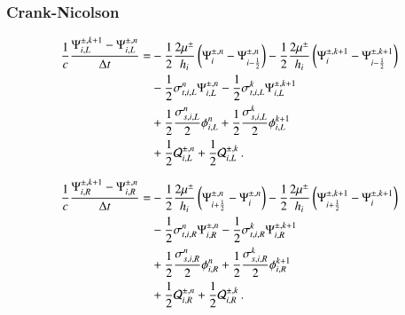 \subsubsection{Crank-Nicolson}
\begin{equation}\lequ{S2CNfullL}\begin{split}
  \frac{1}{c}\frac{\Psi\iL^{\pm,k+1}-\Psi\iL^{\pm,n}}{\dt} = &
  -\half\frac{2\mu^\pm}{h_i}\fn{\Psi^{\pm,n}_i - \Psi^{\pm,n}_{i-\half}}
  -\half\frac{2\mu^\pm}{h_i}\fn{\Psi^{\pm,k+1}_i - \Psi^{\pm,k+1}_{i-\half}}\\
  &-\half\sigma_{t,i,L}^n\Psi\iL^{\pm,n}
   -\half\sigma_{t,i,L}^k\Psi\iL^{\pm,k+1}\\
  &+\half\frac{\sigma_{s,i,L}^n}{2}\phi\iL^n
   +\half\frac{\sigma_{s,i,L}^k}{2}\phi\iL^{k+1}\\
  &+\half\Q_{i,L}^{\pm,n}
   +\half\Q_{i,L}^{\pm,k} \pep
\end{split}\end{equation}

\begin{equation}\lequ{S2CNfullR}\begin{split}
  \frac{1}{c}\frac{\Psi\iR^{\pm,k+1}-\Psi\iR^{\pm,n}}{\dt} = &
  -\half\frac{2\mu^\pm}{h_i}\fn{\Psi^{\pm,n}_{i+\half} - \Psi^{\pm,n}_i}
  -\half\frac{2\mu^\pm}{h_i}\fn{\Psi^{\pm,k+1}_{i+\half} - \Psi^{\pm,k+1}_i}\\
  &-\half\sigma_{t,i,R}^n\Psi\iR^{\pm,n}
   -\half\sigma_{t,i,R}^k\Psi\iR^{\pm,k+1}\\
  &+\half\frac{\sigma_{s,i,R}^n}{2}\phi\iR^n
   +\half\frac{\sigma_{s,i,R}^k}{2}\phi\iR^{k+1}\\
  &+\half\Q_{i,R}^{\pm,n}
   +\half\Q_{i,R}^{\pm,k} \pep
\end{split}\end{equation}

